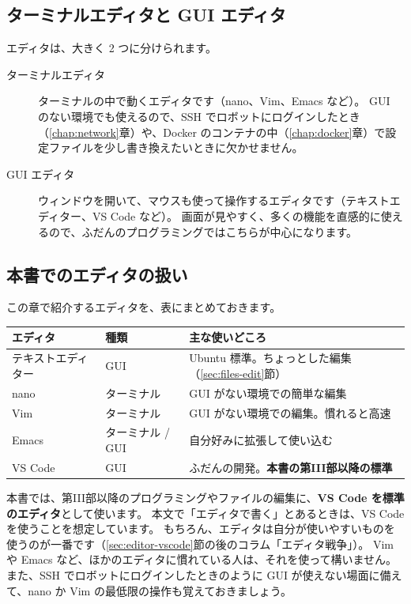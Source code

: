 \subsection{ターミナルエディタと GUI エディタ}

エディタは、大きく 2 つに分けられます。

\begin{description}
  \item[ターミナルエディタ]
    ターミナルの中で動くエディタです（nano、Vim、Emacs など）。
    GUI のない環境でも使えるので、SSH でロボットにログインしたとき（\ref{chap:network}章）や、Docker のコンテナの中（\ref{chap:docker}章）で設定ファイルを少し書き換えたいときに欠かせません。
  \item[GUI エディタ]
    ウィンドウを開いて、マウスも使って操作するエディタです（テキストエディター、VS Code など）。
    画面が見やすく、多くの機能を直感的に使えるので、ふだんのプログラミングではこちらが中心になります。
\end{description}

\subsection{本書でのエディタの扱い}

この章で紹介するエディタを、表にまとめておきます。

\begin{tablebox}
  \begin{tabular}{lll}
    \toprule
    エディタ & 種類 & 主な使いどころ \\
    \midrule
    テキストエディター & GUI & Ubuntu 標準。ちょっとした編集（\ref{sec:files-edit}節） \\
    nano & ターミナル & GUI がない環境での簡単な編集 \\
    Vim & ターミナル & GUI がない環境での編集。慣れると高速 \\
    Emacs & ターミナル / GUI & 自分好みに拡張して使い込む \\
    VS Code & GUI & ふだんの開発。\textbf{本書の第III部以降の標準} \\
    \bottomrule
  \end{tabular}
\end{tablebox}

本書では、第III部以降のプログラミングやファイルの編集に、\textbf{VS Code を標準のエディタ}として使います。
本文で「エディタで書く」とあるときは、VS Code を使うことを想定しています。
もちろん、エディタは自分が使いやすいものを使うのが一番です（\ref{sec:editor-vscode}節の後のコラム「エディタ戦争」）。
Vim や Emacs など、ほかのエディタに慣れている人は、それを使って構いません。
また、SSH でロボットにログインしたときのように GUI が使えない場面に備えて、nano か Vim の最低限の操作も覚えておきましょう。

